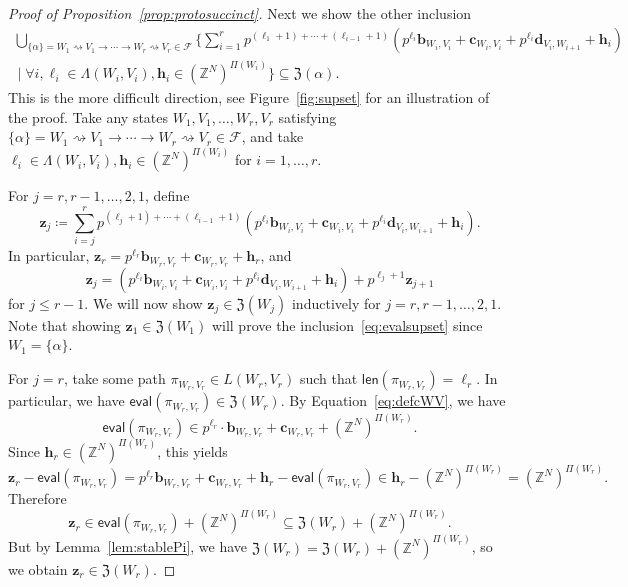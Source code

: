 \documentclass[letterpaper, 11pt, thm-restate]{article}
\numberwithin{equation}{section}
\newcommand{\Z}{\mathbb{Z}}
\newcommand{\mF}{\mathcal{F}}
\newcommand{\mZ}{\mathfrak{Z}}
\newcommand{\bb}{\boldsymbol{b}}
\newcommand{\bc}{\boldsymbol{c}}
\newcommand{\bd}{\boldsymbol{d}}
\newcommand{\bh}{\boldsymbol{h}}
\newcommand{\bz}{\boldsymbol{z}}
\newcommand{\len}{\mathsf{len}}
\newcommand{\eval}{\mathsf{eval}}
\theoremstyle{definition}
\theoremstyle{definition}
\theoremstyle{definition}
\begin{document}
\begin{proof}[Proof of Proposition~\ref{prop:protosuccinct}]
    Next we show the other inclusion
    \begin{multline}\label{eq:evalsupset}
        \bigcup_{\{\alpha\} = W_1 \rightsquigarrow V_1 \rightarrow \cdots \rightarrow W_r \rightsquigarrow V_r \in \mF} \Bigg\{\sum_{i = 1}^r p^{(\ell_1 + 1) + \cdots + (\ell_{i-1} + 1)} \left(p^{\ell_i} \bb_{W_i, V_i} + \bc_{W_i, V_i} + p^{\ell_i} \bd_{V_i, W_{i+1}} + \bh_i \right) \\
        \;\Bigg|\; \forall i, \ell_i \in \Lambda(W_i, V_i), \bh_i \in (\Z^N)^{\Pi(W_i)} \Bigg\} \subseteq \mZ(\alpha).
    \end{multline}
    This is the more difficult direction, see Figure~\ref{fig:supset} for an illustration of the proof.
    Take any states $W_1, V_1, \ldots, W_r, V_r$ satisfying $\{\alpha\} = W_1 \rightsquigarrow V_1 \rightarrow \cdots \rightarrow W_r \rightsquigarrow V_r \in \mF$, and take $\ell_i \in \Lambda(W_i, V_i), \bh_i \in (\Z^N)^{\Pi(W_i)}$ for $i = 1, \ldots, r$.
    
    For $j = r, r-1, \ldots, 2, 1$, define
    \[
    \bz_j \coloneqq \sum_{i = j}^r p^{(\ell_j + 1) + \cdots + (\ell_{i-1} + 1)} \left(p^{\ell_i} \bb_{W_i, V_i} + \bc_{W_i, V_i} + p^{\ell_i} \bd_{V_i, W_{i+1}} + \bh_i \right).
    \]
    In particular, $\bz_r = p^{\ell_r} \bb_{W_r, V_r} + \bc_{W_r, V_r} + \bh_r$, and 
    \begin{equation}\label{eq:reczj}
        \bz_{j} = \left(p^{\ell_i} \bb_{W_i, V_i} + \bc_{W_i, V_i} + p^{\ell_i} \bd_{V_i, W_{i+1}} + \bh_i \right) + p^{\ell_j + 1} \bz_{j+1}
    \end{equation}
    for $j \leq r-1$.    
    We will now show $\bz_j \in \mZ(W_j)$ inductively for $j = r, r-1, \ldots, 2, 1$.
    Note that showing $\bz_1 \in \mZ(W_1)$ will prove the inclusion~\eqref{eq:evalsupset} since $W_1 = \{\alpha\}$.
    
    For $j = r$, take some path $\pi_{W_r, V_r} \in L(W_r, V_r)$ such that $\len(\pi_{W_r, V_r}) = \ell_r$. 
    In particular, we have $\eval(\pi_{W_r, V_r}) \in \mZ(W_r)$.
    By Equation~\eqref{eq:defcWV}, we have
    \[
    \eval(\pi_{W_r, V_r}) \in p^{\ell_r} \cdot \bb_{W_r, V_r} + \bc_{W_r, V_r} + (\Z^N)^{\Pi(W_r)}.
    \]
    Since $\bh_r \in (\Z^N)^{\Pi(W_r)}$, this yields
    \[
    \bz_r - \eval(\pi_{W_r, V_r}) = p^{\ell_r} \bb_{W_r, V_r} + \bc_{W_r, V_r} + \bh_r - \eval(\pi_{W_r, V_r}) \in \bh_r - (\Z^N)^{\Pi(W_r)} = (\Z^N)^{\Pi(W_r)}.
    \]
    Therefore
    \[
    \bz_r \in \eval(\pi_{W_r, V_r}) + (\Z^N)^{\Pi(W_r)} \subseteq \mZ(W_r) + (\Z^N)^{\Pi(W_r)}.
    \]
    But by Lemma~\ref{lem:stablePi}, we have $\mZ(W_r) = \mZ(W_r) + (\Z^N)^{\Pi(W_r)}$, so we obtain $\bz_r \in \mZ(W_r)$.


\end{proof}
\end{document}
